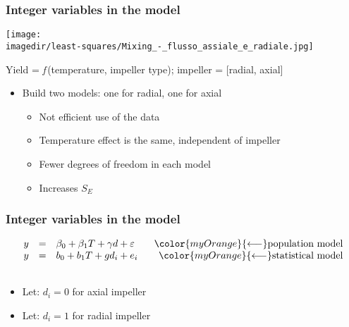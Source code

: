 \begin{frame}\frametitle{Integer variables in the model}
	\begin{center}
		\texttt{[image: \\imagedir/least-squares/Mixing\_-\_flusso\_assiale\_e\_radiale.jpg]}
	\end{center}
	\vspace{-16pt}

	\vspace{12pt}
	Yield = \emph{f}\,(temperature, impeller type); impeller = [radial, axial]
	\begin{itemize}
		\item	Build two models: one for radial, one for axial
		\begin{itemize}
			\item	Not efficient use of the data
			\item	Temperature effect is the same, independent of impeller
			\item	Fewer degrees of freedom in each model
			\item	Increases $S_E$
		\end{itemize}
	\end{itemize}
\end{frame}

\begin{frame}\frametitle{Integer variables in the model}
	$$
	\begin{array}{lcr}
		y &=& \beta_0 + \beta_1 T + \gamma d + \varepsilon \qquad\hfill {\color{myOrange}{\longleftarrow}\text{population model}}\\
		y &=& b_0 + b_1 T + g d_i + e_i \qquad \hfill {\color{myOrange}{\longleftarrow}\text{statistical model}}\\
		\\
	\end{array}
	$$
	\begin{itemize}
		\item	Let: $d_i = 0$ for axial impeller
		\item	Let: $d_i = 1$ for radial impeller
	\end{itemize}
\end{frame}

